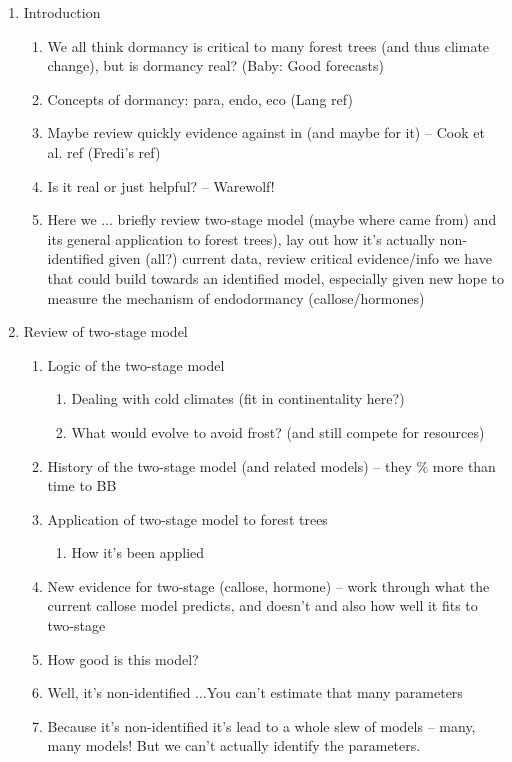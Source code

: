 \documentclass[11pt,letter]{article}
\begin{document}
\begin{enumerate}
\item Introduction
\begin{enumerate}
\item We all think dormancy is critical to many forest trees (and thus climate change), but is dormancy real? (Baby: Good forecasts)
\item Concepts of dormancy: para, endo, eco (Lang ref)
\item Maybe review quickly evidence against in (and maybe for it) -- Cook et al. ref (Fredi's ref)
\item Is it real or just helpful? -- Warewolf!
\item Here we ... briefly review two-stage model  (maybe where came from) and its general application to forest trees), lay out how it's actually non-identified given (all?) current data, review critical evidence/info we have that could build towards an identified model, especially given new hope to measure the mechanism of endodormancy (callose/hormones)
\end{enumerate}
\item Review of two-stage model
\begin{enumerate}
\item Logic of the two-stage model
\begin{enumerate}
\item Dealing with cold climates (fit in continentality here?)
\item What would evolve to avoid frost? (and still compete for resources)
\end{enumerate}
\item History of the two-stage model (and related models) --  they \% more than time to BB
\item Application of two-stage model to forest trees
\begin{enumerate}
\item How it's been applied
\end{enumerate}
\item New evidence for two-stage (callose, hormone) -- work through what the current callose model predicts, and doesn't and also how well it fits to two-stage
\item How good is this model? %
\item Well, it's non-identified ...You can't estimate that many parameters
\item Because it's non-identified it's lead to a whole slew of models -- many, many models! But we can't actually identify the parameters. 

\end{enumerate}
\end{enumerate}
\end{document}
